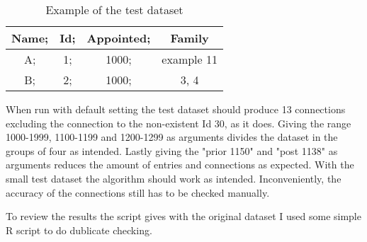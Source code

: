 \begin{table}
	\caption{Example of the test dataset}
	\centering
	\begin{tabular}{cccc}	
		\hline
		Name; &Id; &Appointed; &Family\\
		\hline
		A; &1; &1000; &example 11\\
		\hline
		B; &2; &1000; &3, 4\\
		\hline
	\end{tabular}
\end{table}

When run with default setting the test dataset should produce 13 connections excluding the connection to the non-existent Id 30, as it does. Giving the range 1000-1999, 1100-1199 and 1200-1299 as arguments divides the dataset in the groups of four as intended. Lastly giving the "prior 1150" and "post 1138" as arguments reduces the amount of entries and connections as expected. With the small test dataset the algorithm should work as intended. Inconveniently, the accuracy of the connections still has to be checked manually. 

To review the results the script gives with the original dataset I used some simple R script to do dublicate checking.